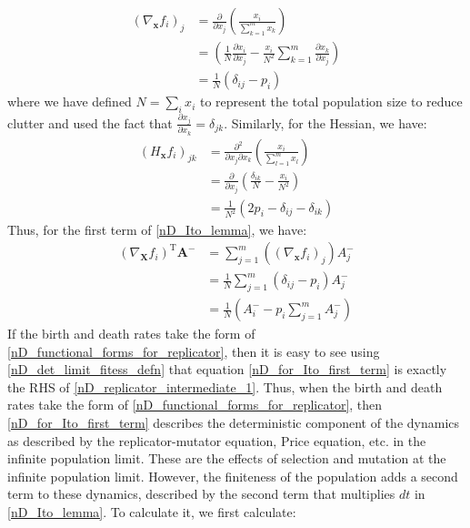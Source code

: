 \begin{align}
\left(\nabla_{\mathbf{x}} f_i\right)_j &= \frac{\partial }{\partial x_j}\left(\frac{x_i}{\sum\limits_{k=1}^{m}x_k}\right)\nonumber\\
&= \left(\frac{1}{N}\frac{\partial x_i}{\partial x_j} 
- \frac{x_i}{N^2}\sum\limits_{k=1}^{m}\frac{\partial x_k}{\partial x_j}\right)\nonumber\\
&= \frac{1}{N}\left(\delta_{ij}-p_i\right)\label{nD_jacobian_for_ito}
\end{align}
where we have defined $N = \sum_i x_i$ to represent the total population size to reduce clutter and used the fact that $\frac{\partial x_j}{\partial x_k} = \delta_{jk}$.
Similarly, for the Hessian, we have:
\begin{align}
\left(H_{\mathbf{x}} f_i\right)_{jk} &= \frac{\partial^2 }{\partial x_j \partial x_k}\left( \frac{x_i}{\sum\limits_{l=1}^{m}x_l}\right)\nonumber\\
&= \frac{\partial}{\partial x_j}\left(\frac{\delta_{ik}}{N}-\frac{x_i}{N^2}\right)\nonumber\\
&= \frac{1}{N^2}\left(2p_i - \delta_{ij}-\delta_{ik}\right)\label{nD_hessian_for_ito}
\end{align}
Thus, for the first term of \eqref{nD_Ito_lemma}, we have:
\begin{align}
\left(\nabla_{\mathbf{X}}f_i\right)^{\mathrm{T}}\boldsymbol{\mathbf{A}^{-}} &= \sum\limits_{j=1}^{m}\left(\left(\nabla_{\mathbf{x}} f_i\right)_j\right)A^{-}_{j} \nonumber\\
&= \frac{1}{N}\sum\limits_{j=1}^{m}\left(\delta_{ij}-p_i\right)A^{-}_{j}\nonumber\\
&= \frac{1}{N}\left(A^{-}_{i} - p_i\sum\limits_{j=1}^{m}A^{-}_{j}\right)\label{nD_for_Ito_first_term}
\end{align}
If the birth and death rates take the form of \eqref{nD_functional_forms_for_replicator}, then it is easy to see using \eqref{nD_det_limit_fitess_defn} that equation \eqref{nD_for_Ito_first_term} is exactly the RHS of \eqref{nD_replicator_intermediate_1}. Thus, when the birth and death rates take the form of \eqref{nD_functional_forms_for_replicator}, then \eqref{nD_for_Ito_first_term} describes the deterministic component of the dynamics as described by the replicator-mutator equation, Price equation, etc. in the infinite population limit. These are the effects of selection and mutation at the infinite population limit. However, the finiteness of the population adds a second term to these dynamics, described by the second term that multiplies $dt$ in \eqref{nD_Ito_lemma}. To calculate it, we first calculate:
